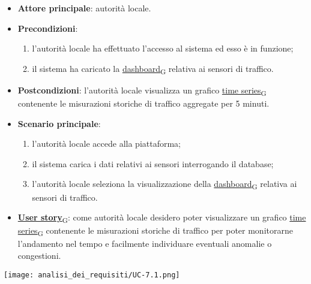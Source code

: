 \begin{itemize}
	\item \textbf{Attore principale}: autorità locale.
	\item \textbf{Precondizioni}:
	      \begin{enumerate}
		      \item l'autorità locale ha effettuato l'accesso al sistema ed esso è in funzione;
		      \item il sistema ha caricato la \href{https://7last.github.io/docs/pb/documentazione-interna/glossario\#dashboard}{dashboard\textsubscript{G}} relativa ai sensori di traffico.
	      \end{enumerate}
	\item \textbf{Postcondizioni}: l'autorità locale visualizza un grafico \href{https://7last.github.io/docs/pb/documentazione-interna/glossario\#time-series}{time series\textsubscript{G}} contenente le misurazioni storiche di traffico aggregate per 5 minuti.
	\item \textbf{Scenario principale}:
	      \begin{enumerate}
		      \item l'autorità locale accede alla piattaforma;
		      \item il sistema carica i dati relativi ai sensori interrogando il database;
		      \item l'autorità locale seleziona la visualizzazione della \href{https://7last.github.io/docs/pb/documentazione-interna/glossario\#dashboard}{dashboard\textsubscript{G}} relativa ai sensori di traffico.
	      \end{enumerate}
	\item \href{https://7last.github.io/docs/pb/documentazione-interna/glossario\#user-story}{\textbf{User story}\textsubscript{G}}:
	      come autorità locale desidero poter visualizzare un grafico \href{https://7last.github.io/docs/pb/documentazione-interna/glossario\#time-series}{time series\textsubscript{G}} contenente le misurazioni storiche
	      di traffico per poter monitorarne l'andamento nel tempo e facilmente individuare eventuali anomalie
	      o congestioni.
\end{itemize}
\begin{center}
	\texttt{[image: analisi\_dei\_requisiti/UC-7.1.png]}
\end{center}


